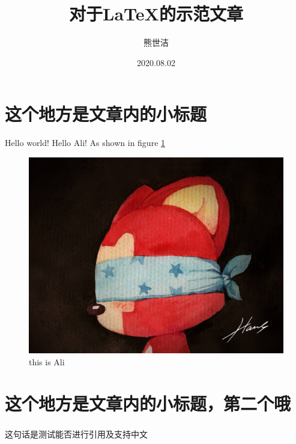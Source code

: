 \documentclass[fontset=windows]{article}
\title{\heiti\zihao{2}对于LaTeX的示范文章}  %
\author{\songti 熊世洁}  %
\date{2020.08.02}  %
\newcommand{\upcite}[1]{\textsuperscript{\cite{#1}}}
\begin{document}
	\maketitle
	\thispagestyle{empty}

\begin{abstract}
	\lipsum[2]  %
\end{abstract}

\tableofcontents

\section{这个地方是文章内的小标题}
Hello world! Hello Ali! As shown in figure \ref{1}
\begin{figure}[htbp]
	\centering
	\includegraphics[scale=0.1]{Ali.jpg}
	\caption{this is Ali}
	\label{1}
\end{figure}


\section{这个地方是文章内的小标题，第二个哦}

这句话是测试能否进行引用及支持中文 \upcite{1}


\end{document}
